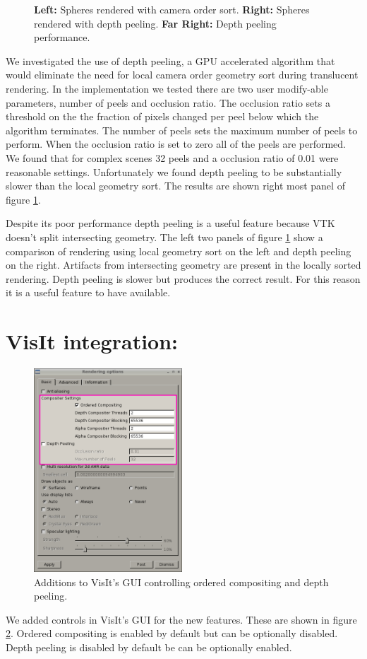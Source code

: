 \documentclass[a4paper,10pt]{report}
\begin{document}
\begin{figure}
\begin{minipage}{0.3\textwidth}
\begin{center}
\end{center}
\end{minipage}
\caption{\footnotesize {\bf Left:} Spheres rendered with camera order sort. {\bf Right:} Spheres rendered with depth peeling. {\bf Far Right:} Depth peeling performance.}
\label{fig:depth_peel}
\end{figure}
We investigated the use of depth peeling, a GPU accelerated algorithm that would eliminate the need for local camera order geometry sort during translucent rendering. In the implementation we tested there are two user modify-able parameters, number of peels and occlusion ratio. The occlusion ratio sets a threshold on the the fraction of pixels changed per peel below which the algorithm terminates. The number of peels sets the maximum number of peels to perform. When the occlusion ratio is set to zero all of the peels are performed. We found that for complex scenes 32 peels and a occlusion ratio of 0.01 were reasonable settings.  Unfortunately we found depth peeling to be substantially slower than the local geometry sort. The results are shown right most panel of figure \ref{fig:depth_peel}. 

Despite its poor performance depth peeling is a useful feature because VTK doesn't split intersecting geometry. The left two panels of figure \ref{fig:depth_peel} show a comparison of rendering using local geometry sort on the left and depth peeling on the right. Artifacts from intersecting geometry are present in the locally sorted rendering. Depth peeling is slower but produces the correct result. For this reason it is a useful feature to have available.

\section{VisIt integration:}
\begin{figure}
 \centering
 \includegraphics[height=3in]{./settings_window.png}
 \caption{Additions to VisIt's GUI controlling ordered compositing and depth peeling.}
 \label{fig:settings}
\end{figure}
We added controls in VisIt's GUI for the new features. These are shown in figure \ref{fig:settings}. Ordered compositing is enabled by default but can be optionally  disabled. Depth peeling is disabled by default be can be optionally enabled.
\end{document}
